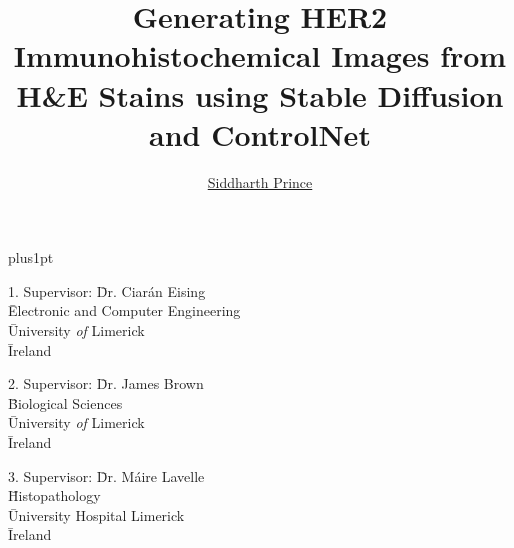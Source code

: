 \documentclass[oneside,12pt]{Latex/Classes/PhDthesisPSnPDF}
\title{Generating HER2 Immunohistochemical Images from H\&E Stains using Stable Diffusion and ControlNet}
\author{\href{mailto: sprince.ie.31@gmail.com}{Siddharth Prince}}
\begin{document}



\renewcommand\baselinestretch{1.2}
\baselineskip=18pt plus1pt



\maketitle  %



\newpage


 \begin{tabbing}
1.  Supervisor: \= Dr. Ciarán Eising    \\
 \>  \= Electronic and Computer Engineering\\
 \>  \= University \emph{of} Limerick \\
 \>  \= Ireland \\
 \end{tabbing}


 \begin{tabbing}
2. Supervisor: \= Dr. James Brown \\
 \>  \= Biological Sciences \\
 \>  \= University \emph{of} Limerick \\
 \>  \= Ireland \\
\end{tabbing}

\begin{tabbing}
3. Supervisor: \= Dr. Máire Lavelle \\
 \>  \= Histopathology \\
 \>  \= University Hospital Limerick \\
 \>  \= Ireland \\
\end{tabbing}


\vspace{10mm}




\end{document}
